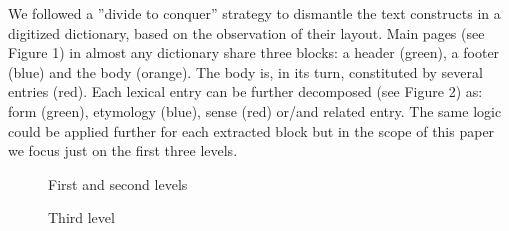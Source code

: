 \documentclass[twocolumn,a4paper]{article}
\begin{document}
 We followed a ”divide to conquer” strategy to dismantle the text constructs in a digitized dictionary, based on the observation of their layout. Main pages (see Figure 1) in almost any dictionary share three blocks: a header (green), a footer (blue) and the body (orange). 
The body is, in its turn, constituted by several entries (red). Each lexical entry can be further decomposed (see Figure 2) as: form (green), etymology (blue), sense (red) or/and related entry. The same logic could be applied further for each extracted block but in the scope of this paper we focus just on the first three levels.
 \begin{figure}
\caption{First and second levels\label{fig:mouseover}}
\end{figure}
\begin{figure}
\caption{Third level\label{fig:mouseover}}
\end{figure}  
 
\end{document}
